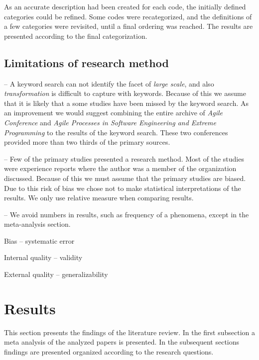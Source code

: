 \documentclass[preprint,authoryear,12pt]{elsarticle}
\begin{document}
As an accurate description had been created for each code, the initially defined
categories could be refined. Some codes were recategorized, and the definitions
of a few categories were revisited, until a final ordering was reached. The
results are presented according to the final categorization.



\subsection{Limitations of research method}

-- A keyword search can not identify the facet of \emph{large scale}, and also
   \emph{transformation} is difficult to capture with keywords. Because of this
   we assume that it is likely that a some studies have been missed by the
   keyword search. As an improvement we would suggest combining the entire
   archive of \emph{Agile Conference} and \emph{Agile Processes in Software
   Engineering and Extreme Programming} to the results of the keyword search.
   These two conferences provided more than two thirds of the primary sources.

-- Few of the primary studies presented a research method. Most of the studies
   were experience reports where the author was a member of the organization
   discussed. Because of this we must assume that the primary studies are
   biased. Due to this risk of bias we chose not to make statistical
   interpretations of the results. We only use relative measure when comparing
   results.

-- We avoid numbers in results, such as frequency of a phenomena, except in the
   meta-analysis section.


Bias  --  systematic error

Internal quality  --  validity

External quality  --  generalizability


\clearpage

\section{Results}
\label{sec:results}

This section presents the findings of the literature review. In the first
subsection a meta analysis of the analyzed papers is presented. In the
subsequent sections findings are presented organized according to the research
questions.
\end{document}
